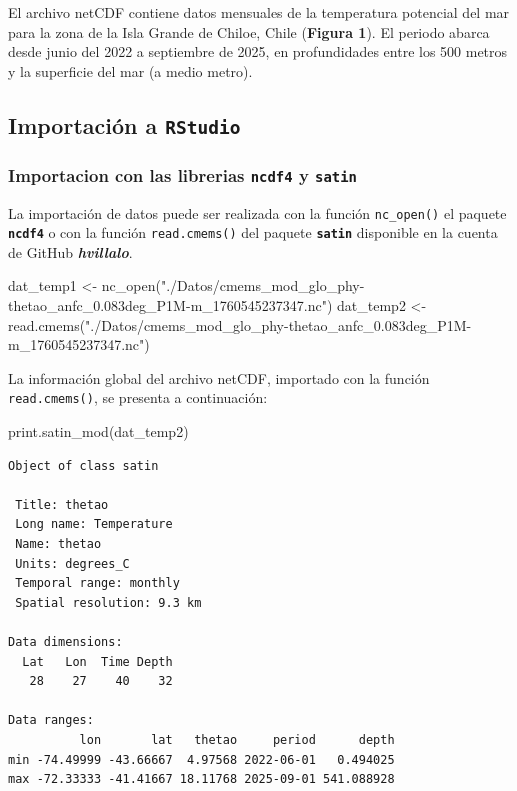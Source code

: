 \documentclass[
]{article}
\newenvironment{Shaded}{\begin{snugshade}}{\end{snugshade}}
\newcommand{\FunctionTok}[1]{\textcolor[rgb]{0.28,0.35,0.67}{#1}}
\newcommand{\NormalTok}[1]{\textcolor[rgb]{0.00,0.23,0.31}{#1}}
\newcommand{\OtherTok}[1]{\textcolor[rgb]{0.00,0.23,0.31}{#1}}
\newcommand{\StringTok}[1]{\textcolor[rgb]{0.13,0.47,0.30}{#1}}
\begin{document}
El archivo netCDF contiene datos mensuales de la temperatura potencial
del mar para la zona de la Isla Grande de Chiloe, Chile (\textbf{Figura
1}). El periodo abarca desde junio del 2022 a septiembre de 2025, en
profundidades entre los 500 metros y la superficie del mar (a medio
metro).

\subsection{\texorpdfstring{Importación a
\texttt{RStudio}}{Importación a RStudio}}\label{importaciuxf3n-a-rstudio}

\subsubsection{\texorpdfstring{Importacion con las librerias
\textbf{\texttt{ncdf4}} y
\textbf{\texttt{satin}}}{Importacion con las librerias ncdf4 y satin}}\label{importacion-con-las-librerias-ncdf4-y-satin}

La importación de datos puede ser realizada con la función
\texttt{nc\_open()} el paquete \textbf{\texttt{ncdf4}} o con la función
\texttt{read.cmems()} del paquete \textbf{\texttt{satin}} disponible en
la cuenta de GitHub \textbf{\emph{hvillalo}}.

\begin{Shaded}
\begin{Highlighting}[]
\NormalTok{dat\_temp1 }\OtherTok{\textless{}{-}} \FunctionTok{nc\_open}\NormalTok{(}\StringTok{"./Datos/cmems\_mod\_glo\_phy{-}thetao\_anfc\_0.083deg\_P1M{-}m\_1760545237347.nc"}\NormalTok{)}
\NormalTok{dat\_temp2 }\OtherTok{\textless{}{-}} \FunctionTok{read.cmems}\NormalTok{(}\StringTok{"./Datos/cmems\_mod\_glo\_phy{-}thetao\_anfc\_0.083deg\_P1M{-}m\_1760545237347.nc"}\NormalTok{)}
\end{Highlighting}
\end{Shaded}

La información global del archivo netCDF, importado con la función
\texttt{read.cmems()}, se presenta a continuación:

\begin{Shaded}
\begin{Highlighting}[]
\FunctionTok{print.satin\_mod}\NormalTok{(dat\_temp2)}
\end{Highlighting}
\end{Shaded}

\begin{verbatim}
Object of class satin

 Title: thetao 
 Long name: Temperature 
 Name: thetao 
 Units: degrees_C 
 Temporal range: monthly 
 Spatial resolution: 9.3 km 

Data dimensions:
  Lat   Lon  Time Depth 
   28    27    40    32 

Data ranges:
          lon       lat   thetao     period      depth
min -74.49999 -43.66667  4.97568 2022-06-01   0.494025
max -72.33333 -41.41667 18.11768 2025-09-01 541.088928
\end{verbatim}
\end{document}
